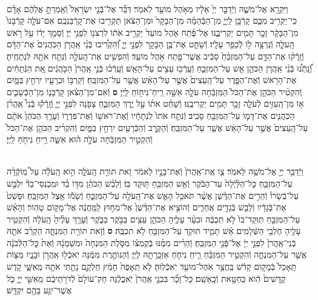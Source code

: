 \documentclass[twoside, openany, parskip=half, 11pt]{book}
\begin{document}
\begin{footnotesize}
\begin{multicols}{2}
\\
וַיִּקְרָ֖א אֶל־מֹשֶׁ֑ה וַיְֿדַבֵּ֤ר יְיָ֙ אֵלָ֔יו מֵאֹ֥הֶל מוֹעֵ֖ד לֵאמֹֽר׃ דַּבֵּ֞ר אֶל־בְּֿנֵ֤י יִשְׂרָאֵל֙ וְֿאָֽמַרְתָּ֣ אֲלֵהֶ֔ם אָדָ֗ם כִּֽי־יַקְרִ֥יב מִכֶּ֛ם קָרְֿבָּ֖ן לַֽיְיָ֑ מִן־הַבְּֿהֵמָ֗ה מִן־הַבָּקָר֙ וּמִן־הַצֹּ֔אן תַּקְרִ֖יבוּ אֶת־קָרְֿבַּנְכֶֽם׃ אִם־עֹלָ֤ה קָרְֿבָּנוֹ֙ מִן־הַבָּקָ֔ר זָכָ֥ר תָּמִ֖ים יַקְרִיבֶ֑נּוּ אֶל־פֶּ֜תַח אֹ֤הֶל מוֹעֵד֙ יַקְרִ֣יב אֹת֔וֹ לִרְצֹנ֖וֹ לִפְנֵ֥י יְיָ׃
וְֿסָמַ֣ךְ יָד֔וֹ עַ֖ל רֹ֣אשׁ הָֽעֹלָ֑ה וְֿנִרְצָ֥ה ל֖וֹ לְֿכַפֵּ֥ר עָלָֽיו׃
וְֿשָׁחַ֛ט אֶת־בֶּ֥ן הַבָּקָ֖ר לִפְנֵ֣י יְיָ֑ וְֿ֠הִקְרִ֠יבוּ בְּֿנֵ֨י אַֽהֲרֹ֤ן הַכֹּֽהֲנִים֙ אֶת־הַדָּ֔ם וְֿזָֽרְֿק֨וּ אֶת־הַדָּ֤ם עַל־הַמִּזְבֵּ֨חַ֙ סָבִ֔יב אֲשֶׁר־פֶּ֖תַח אֹ֥הֶל מוֹעֵֽד׃ וְֿהִפְשִׁ֖יט אֶת־הָֽעֹלָ֑ה וְֿנִתַּ֥ח אֹתָ֖הּ לִנְתָחֶֽיהָ׃ וְֿ֠נָֽתְֿנ֠וּ בְּֿנֵ֨י אַֽהֲרֹ֧ן הַכֹּהֵ֛ן אֵ֖שׁ עַל־הַמִּזְבֵּ֑חַ וְֿעָֽרְֿכ֥וּ עֵצִ֖ים עַל־הָאֵֽשׁ׃ וְֿעָֽרְֿכ֗וּ בְּֿנֵ֤י אַֽהֲרֹן֙ הַכֹּ֣הֲנִ֔ים אֵ֚ת הַנְּֿתָחִ֔ים אֶת־הָרֹ֖אשׁ וְֿאֶת־הַפָּ֑דֶר עַל־הָֽעֵצִים֙ אֲשֶׁ֣ר עַל־הָאֵ֔שׁ אֲשֶׁ֖ר עַל־הַמִּזְבֵּֽחַ׃ וְֿקִרְבּ֥וֹ וּכְרָעָ֖יו יִרְחַ֣ץ בַּמָּ֑יִם וְֿהִקְטִ֨יר הַכֹּהֵ֤ן אֶת־הַכֹּל֙ הַמִּזְבֵּ֔חָה עֹלָ֛ה אִשֵּׁ֥ה רֵֽיחַ־נִיח֖וֹחַ לַֽיְיָ׃ \textbf{ס}  וְֿאִם־מִן־הַצֹּ֨אן קָרְֿבָּנ֧וֹ מִן־הַכְּֿשָׂבִ֛ים א֥וֹ מִן־הָֽעִזִּ֖ים לְֿעֹלָ֑ה זָכָ֥ר תָּמִ֖ים יַקְרִיבֶֽנּוּ׃ וְֿשָׁחַ֨ט אֹת֜וֹ עַ֣ל יֶ֧רֶךְ הַמִּזְבֵּ֛חַ צָפֹ֖נָה לִפְנֵ֣י יְיָ֑ וְֿזָֽרְֿק֡וּ בְּֿנֵי֩ אַֽהֲרֹ֨ן הַכֹּֽהֲנִ֧ים אֶת־דָּמ֛וֹ עַל־הַמִּזְבֵּ֖חַ סָבִֽיב׃ וְֿנִתַּ֤ח אֹתוֹ֙ לִנְתָחָ֔יו וְֿאֶת־רֹאשׁ֖וֹ וְֿאֶת־פִּדְר֑וֹ וְֿעָרַ֤ךְ הַכֹּהֵן֙ אֹתָ֔ם עַל־הָֽעֵצִים֙ אֲשֶׁ֣ר עַל־הָאֵ֔שׁ אֲשֶׁ֖ר עַל־הַמִּזְבֵּֽחַ׃ וְֿהַקֶּ֥רֶב וְֿהַכְּֿרָעַ֖יִם יִרְחַ֣ץ בַּמָּ֑יִם וְֿהִקְרִ֨יב הַכֹּהֵ֤ן אֶת־הַכֹּל֙ וְֿהִקְטִ֣יר הַמִּזְבֵּ֔חָה עֹלָ֣ה ה֗וּא אִשֵּׁ֛ה רֵ֥יחַ נִיחֹ֖חַ לַֽיְיָ׃

\\
וַיְֿדַבֵּ֥ר יְיָ֖ אֶל־מֹשֶׁ֥ה לֵּאמֹֽר׃ צַ֤ו אֶֽת־אַֽהֲרֹן֙ וְֿאֶת־בָּנָ֣יו לֵאמֹ֔ר זֹ֥את תּוֹרַ֖ת הָֽעֹלָ֑ה הִ֣וא הָֽעֹלָ֡ה עַל֩ מֽוֹקְֿדָ֨ה עַל־הַמִּזְבֵּ֤חַ כׇּל־הַלַּ֨יְֿלָה֙ עַד־הַבֹּ֔קֶר וְֿאֵ֥שׁ הַמִּזְבֵּ֖חַ תּ֥וּקַד בּֽוֹ׃ וְֿלָבַ֨שׁ הַכֹּהֵ֜ן מִדּ֣וֹ בַ֗ד וּמִֽכְנְסֵי־בַד֘ יִלְבַּ֣שׁ עַל־בְּֿשָׂרוֹ֒ וְֿהֵרִ֣ים אֶת־הַדֶּ֗שֶׁן אֲשֶׁ֨ר תֹּאכַ֥ל הָאֵ֛שׁ אֶת־הָֽעֹלָ֖ה עַל־הַמִּזְבֵּ֑חַ וְֿשָׂמ֕וֹ אֵ֖צֶל הַמִּזְבֵּֽחַ׃  וּפָשַׁט֙ אֶת־בְּֿגָדָ֔יו וְֿלָבַ֖שׁ בְּֿגָדִ֣ים אֲחֵרִ֑ים וְֿהוֹצִ֤יא אֶת־הַדֶּ֨שֶׁן֙ אֶל־מִח֣וּץ לַֽמַּֽחֲנֶ֔ה אֶל־מָק֖וֹם טָהֽוֹר׃ וְֿהָאֵ֨שׁ עַל־הַמִּזְבֵּ֤חַ תּֽוּקַד־בּוֹ֙ לֹ֣א תִכְבֶּ֔ה וּבִעֵ֨ר עָלֶ֧יהָ הַכֹּהֵ֛ן עֵצִ֖ים בַּבֹּ֣קֶר בַּבֹּ֑קֶר וְֿעָרַ֤ךְ עָלֶ֨יהָ֙ הָֽעֹלָ֔ה וְֿהִקְטִ֥יר עָלֶ֖יהָ חֶלְבֵ֥י הַשְּֿׁלָמִֽים׃ אֵ֗שׁ תָּמִ֛יד תּוּקַ֥ד עַל־הַמִּזְבֵּ֖חַ לֹ֥א תִכְבֶּֽה׃ \textbf{ס}  וְֿזֹ֥את תּוֹרַ֖ת הַמִּנְחָ֑ה הַקְרֵ֨ב אֹתָ֤הּ בְּֿנֵי־אַֽהֲרֹן֙ לִפְנֵ֣י יְיָ֔ אֶל־פְּֿנֵ֖י הַמִּזְבֵּֽחַ׃ וְֿהֵרִ֨ים מִמֶּ֜נּוּ בְּֿקֻמְצ֗וֹ מִסֹּ֤לֶת הַמִּנְחָה֙ וּמִשַּׁמְנָ֔הּ וְֿאֵת֙ כׇּל־הַלְּֿבֹנָ֔ה אֲשֶׁ֖ר עַל־הַמִּנְחָ֑ה וְֿהִקְטִ֣יר הַמִּזְבֵּ֗חַ רֵ֧יחַ נִיחֹ֛חַ אַזְכָּֽרָתָ֖הּ לַֽיְיָ׃ וְֿהַנּוֹתֶ֣רֶת מִמֶּ֔נָּה יֹֽאכְֿל֖וּ אַֽהֲרֹ֣ן וּבָנָ֑יו מַצּ֤וֹת תֵּֽאָכֵל֙ בְּֿמָק֣וֹם קָדֹ֔שׁ בַּֽחֲצַ֥ר אֹֽהֶל־מוֹעֵ֖ד יֹֽאכְֿלֽוּהָ׃ לֹ֤א תֵֽאָפֶה֙ חָמֵ֔ץ חֶלְקָ֛ם נָתַ֥תִּי אֹתָ֖הּ מֵֽאִשָּׁ֑י קֹ֤דֶשׁ קָֽדָשִׁים֙ הִ֔וא כַּֽחַטָּ֖את וְֿכָֽאָשָֽׁם׃ כׇּל־זָכָ֞ר בִּבְנֵ֤י אַֽהֲרֹן֙ יֹֽאכֲלֶ֔נָּה חָק־עוֹלָם֙ לְֿדֹרֹ֣תֵיכֶ֔ם מֵֽאִשֵּׁ֖י יְיָ֑ כֹּ֛ל אֲשֶׁר־יִגַּ֥ע בָּהֶ֖ם יִקְדָּֽשׁ׃


\end{multicols}
\end{footnotesize}
\end{document}
